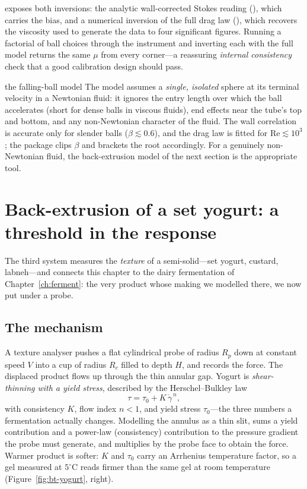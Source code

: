  exposes both inversions: the analytic wall-corrected
Stokes reading (), which carries the bias, and a numerical
inversion of the full drag law (), which recovers the
viscosity used to generate the data to four significant figures. Running a
factorial of ball choices through the instrument and inverting each with the full
model returns the same $\mu$ from every corner---a reassuring \emph{internal
consistency} check that a good calibration design should pass.

\begin{limitbox}{the falling-ball model}
The model assumes a \emph{single, isolated} sphere at its terminal velocity in a
Newtonian fluid: it ignores the entry length over which the ball accelerates
(short for dense balls in viscous fluids), end effects near the tube's top and
bottom, and any non-Newtonian character of the fluid. The wall correlation is
accurate only for slender balls ($\beta \lesssim 0.6$), and the drag law is
fitted for $\mathrm{Re}\lesssim 10^3$; the package clips $\beta$ and brackets the
root accordingly. For a genuinely non-Newtonian fluid, the back-extrusion model
of the next section is the appropriate tool.
\end{limitbox}

\section{Back-extrusion of a set yogurt: a threshold in the response}
\label{sec:bt-yogurt}

The third system measures the \emph{texture} of a semi-solid---set yogurt,
custard, labneh---and connects this chapter to the dairy fermentation of
Chapter~\ref{ch:ferment}: the very product whose making we modelled there, we now
put under a probe.

\subsection{The mechanism}

A texture analyser pushes a flat cylindrical probe of radius $R_p$ down at
constant speed $V$ into a cup of radius $R_c$ filled to depth $H$, and records the
force. The displaced product flows up through the thin annular gap. Yogurt is
\emph{shear-thinning with a yield stress}, described by the Herschel--Bulkley law
%
\begin{equation}
\tau = \tau_0 + K\,\dot\gamma^{\,n},
\label{eq:hb}
\end{equation}
%
with consistency $K$, flow index $n<1$, and yield stress $\tau_0$---the three
numbers a fermentation actually changes. Modelling the annulus as a thin slit,
 sums a yield contribution and a power-law (consistency)
contribution to the pressure gradient the probe must generate, and multiplies by
the probe face to obtain the force. Warmer product is softer: $K$ and $\tau_0$
carry an Arrhenius temperature factor, so a gel measured at $5^\circ$C reads
firmer than the same gel at room temperature (Figure~\ref{fig:bt-yogurt}, right).

